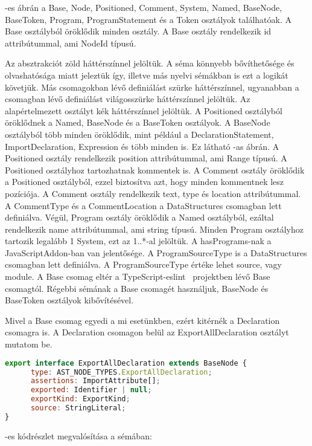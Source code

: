 -es ábrán a Base, Node, Positioned, Comment, System, Named, BaseNode, BaseToken, Program, ProgramStatement és a Token osztályok találhatóak.
A Base osztályból öröklődik minden osztály.
A Base osztály rendelkezik id attribútummal, ami NodeId típusú.


Az absztrakciót zöld háttérszínnel jelöltük.
A séma könnyebb bővíthetősége és olvashatósága miatt jeleztük így, illetve más nyelvi sémákban is ezt a logikát követjük.
Más csomagokban lévő definiálást szürke háttérszínnel, ugyanabban a csomagban lévő definiálást világosszürke háttérszínnel jelöltük.
Az alapértelmezett osztályt kék háttérszínnel jelöltük.
A Positioned osztályból öröklődnek a Named, BaseNode és a BaseToken osztályok.
A BaseNode osztályból több minden öröklődik, mint például a DeclarationStatement, ImportDeclaration, Expression és több minden is. Ez látható -as ábrán.
A Positioned osztály rendelkezik position attribútummal, ami Range típusú. A Positioned osztályhoz tartozhatnak kommentek is.
A Comment osztály öröklődik a Positioned osztályból, ezzel biztosítva azt, hogy minden kommentnek lesz pozíciója.
A Comment osztály rendelkezik text, type és location attribútummal.
A CommentType és a CommentLocation a DataStructures csomagban lett definiálva.
Végül, Program osztály öröklődik a Named osztályból, ezáltal rendelkezik name attribútummal, ami string típusú.
Minden Program osztályhoz tartozik legalább 1 System, ezt az 1..*-al jelöltük.
A hasPrograms-nak a JavaScriptAddon-ban van jelentősége.
A ProgramSourceType is a DataStructures csomagban lett definiálva. A ProgramSourceType értéke lehet source, vagy module.
A Base csomag eltér a TypeScript-eslint~\cite{typescript-eslint} projektben lévő Base csomagtól.
Régebbi sémának a Base csomagét használjuk, BaseNode és BaseToken osztályok kibővítésével.


Mivel a Base csomag egyedi a mi esetünkben, ezért kitérnék a Declaration csomagra is.
A Declaration csomagon belül az ExportAllDeclaration osztályt mutatom be.

\begin{lstlisting}[caption={ExportAllDeclaration TypeScript megvalósítása},label={lst:ExportAllDeclaration}, language={JavaScript}]
export interface ExportAllDeclaration extends BaseNode {
      type: AST_NODE_TYPES.ExportAllDeclaration;
      assertions: ImportAttribute[];
      exported: Identifier | null;
      exportKind: ExportKind;
      source: StringLiteral;
}
\end{lstlisting}
\pagebreak
{}-es kódrészlet megvalósítása a sémában:

